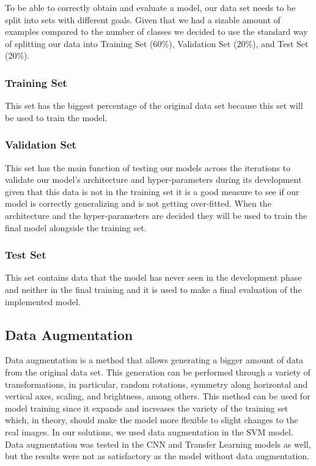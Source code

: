 \documentclass[conference]{IEEEtran}
\begin{document}
To be able to correctly obtain and evaluate a model, our data set needs to be split into sets with different goals. Given that we had a sizable amount of examples compared to the number of classes we decided to use the standard way of splitting our data into Training Set (60\%), Validation Set (20\%), and Test Set (20\%).\cite{b7}\\

\subsubsection{Training Set}

This set has the biggest percentage of the original data set because this set will be used to train the model.\\

\subsubsection{Validation Set}

This set has the main function of testing our models across the iterations to validate our model's architecture and hyper-parameters during its development given that this data is not in the training set it is a good measure to see if our model is correctly generalizing and is not getting over-fitted. When the architecture and the hyper-parameters are decided they will be used to train the final model alongside the training set.\\

\subsubsection{Test Set}
This set contains data that the model has never seen in the development phase and neither in the final training and it is used to make a final evaluation of the implemented model.

\subsection{Data Augmentation}
Data augmentation is a method that allows generating a bigger amount of data from the original data set. This generation can be performed through a variety of transformations, in particular, random rotations, symmetry along horizontal and vertical axes, scaling, and brightness, among others. This method can be used for model training since it expands and increases the variety of the training set which, in theory, should make the model more flexible to slight changes to the real images. In our solutions, we used data augmentation in the SVM model. Data augmentation was tested in the CNN and Transfer Learning models as well, but the results were not as satisfactory as the model without data augmentation.
\end{document}
